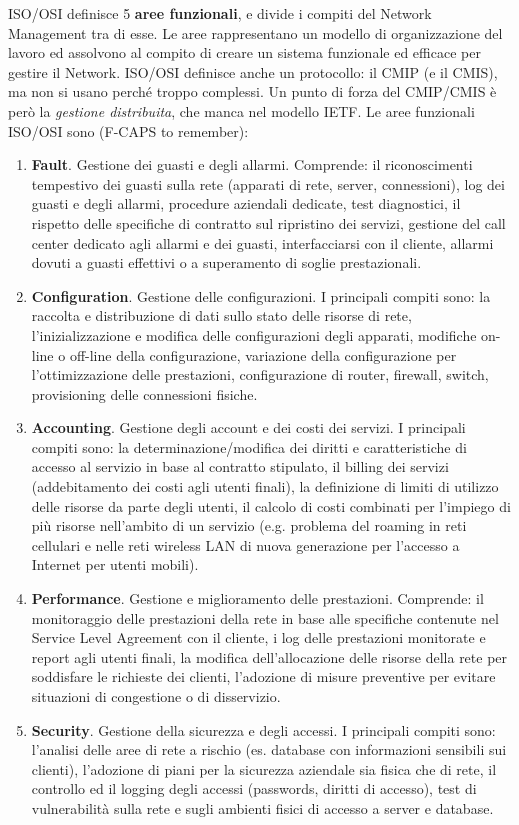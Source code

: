 ISO/OSI definisce 5 \textbf{aree funzionali}, e divide i compiti del Network Management tra di esse. Le aree rappresentano un modello di organizzazione del lavoro ed assolvono al compito di creare un sistema funzionale ed efficace per gestire il Network. ISO/OSI definisce anche un protocollo: il CMIP (e il CMIS), ma non si usano perché troppo complessi. Un punto di forza del CMIP/CMIS è però la \textit{gestione distribuita}, che manca nel modello IETF. Le aree funzionali ISO/OSI sono (F-CAPS to remember):
\begin{enumerate}
	\item \textbf{Fault}. Gestione dei guasti e degli allarmi. Comprende: il riconoscimenti tempestivo dei guasti sulla rete (apparati di rete, server, connessioni), log dei guasti e degli allarmi, procedure aziendali dedicate, test diagnostici, il rispetto delle specifiche di contratto sul ripristino dei servizi, gestione del call center dedicato agli allarmi e dei guasti, interfacciarsi con il cliente, allarmi dovuti a guasti effettivi o a superamento di soglie prestazionali.
	\item \textbf{Configuration}. Gestione delle configurazioni. I principali compiti sono: la raccolta e distribuzione di dati sullo stato delle risorse di rete, l'inizializzazione e modifica delle configurazioni degli apparati, modifiche on-line o off-line della configurazione, variazione della configurazione per l'ottimizzazione delle prestazioni, configurazione di router, firewall, switch, provisioning delle connessioni fisiche.
	\item \textbf{Accounting}. Gestione degli account e dei costi dei servizi. I principali compiti sono: la determinazione/modifica  dei diritti e caratteristiche di accesso al servizio in base al contratto stipulato, il billing dei servizi (addebitamento dei costi agli utenti finali), la definizione di limiti di utilizzo delle risorse da parte degli utenti, il calcolo di costi combinati per l'impiego di più risorse nell'ambito di un servizio (e.g. problema del roaming in reti cellulari e nelle reti wireless LAN di nuova generazione per l'accesso a Internet per utenti mobili).
	\item \textbf{Performance}. Gestione e miglioramento delle prestazioni. Comprende: il monitoraggio delle prestazioni della rete in base alle specifiche contenute nel Service Level Agreement con il cliente, i log delle prestazioni monitorate e report agli utenti finali, la modifica dell'allocazione delle risorse della rete per soddisfare le richieste dei clienti, l'adozione di misure preventive per evitare situazioni di congestione o di disservizio.
	\item \textbf{Security}. Gestione della sicurezza e degli accessi. I principali compiti sono: l'analisi delle aree di rete a rischio (es. database con informazioni sensibili sui clienti), l'adozione di piani per la sicurezza aziendale sia fisica che di rete, il controllo ed il logging degli accessi (passwords, diritti di accesso), test di vulnerabilità sulla rete e sugli ambienti fisici di accesso a server e database.
\end{enumerate}
